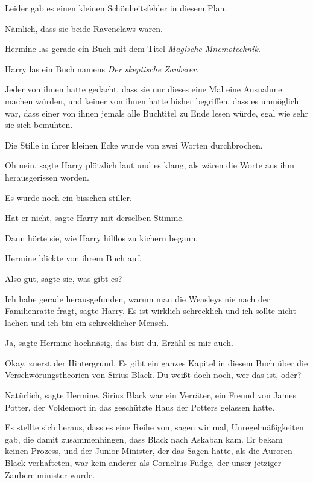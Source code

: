 Leider gab es einen kleinen Schönheitsfehler in diesem Plan.

Nämlich, dass sie beide Ravenclaws waren.

Hermine las gerade ein Buch mit dem Titel \emph{Magische Mnemotechnik.}

Harry las ein Buch namens \emph{\glqq{}Der skeptische Zauberer\grqq{}}.

Jeder von ihnen hatte gedacht, dass sie nur dieses eine Mal eine Ausnahme machen
würden, und keiner von ihnen hatte bisher begriffen, dass es unmöglich war, dass
einer von ihnen jemals alle Buchtitel zu Ende lesen würde, egal wie sehr sie
sich bemühten.

Die Stille in ihrer kleinen Ecke wurde von zwei Worten durchbrochen.

\glqq{}Oh nein\grqq{}, sagte Harry plötzlich laut und es klang, als wären die
Worte aus ihm herausgerissen worden.

Es wurde noch ein bisschen stiller.

\glqq{}Hat er nicht\grqq{}, sagte Harry mit derselben Stimme.

Dann hörte sie, wie Harry hilflos zu kichern begann.

Hermine blickte von ihrem Buch auf.

\glqq{}Also gut\grqq{}, sagte sie, \glqq{}was gibt es?\grqq{}

\glqq{}Ich habe gerade herausgefunden, warum man die Weasleys nie nach der
Familienratte fragt\grqq{}, sagte Harry. \glqq{}Es ist wirklich schrecklich und
ich sollte nicht lachen und ich bin ein schrecklicher Mensch.\grqq{}

\glqq{}Ja\grqq{}, sagte Hermine hochnäsig, \glqq{}das bist du. Erzähl es mir
auch.\grqq{}

\glqq{}Okay, zuerst der Hintergrund. Es gibt ein ganzes Kapitel in diesem Buch
über die Verschwörungstheorien von Sirius Black. Du weißt doch noch, wer das
ist, oder?\grqq{}

\glqq{}Natürlich\grqq{}, sagte Hermine. Sirius Black war ein Verräter, ein
Freund von James Potter, der Voldemort in das geschützte Haus der Potters
gelassen hatte.

\glqq{}Es stellte sich heraus, dass es eine Reihe von, sagen wir mal,
Unregelmäßigkeiten gab, die damit zusammenhingen, dass Black nach Askaban kam.
Er bekam keinen Prozess, und der Junior-Minister, der das Sagen hatte, als die
Auroren Black verhafteten, war kein anderer als Cornelius Fudge, der unser
jetziger Zaubereiminister wurde.\grqq{}

